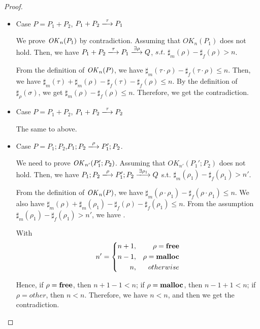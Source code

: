 \begin{proof}
\begin{itemize}
\item Case $P = P_{1} + P_{2}$, \Rtab \(P_1 + P_2 \xlongrightarrow{\tau} P_1\)

  We prove \(\mathit{OK}_n(P_1)\) by contradiction.  Assuming that
  \(OK_{n}(P_1)\) does not hold.  Then, we have \(P_{1} + P_{2}
  \xlongrightarrow{\tau} P_{1} \xlongrightarrow{\exists \rho} Q\),
  \(s.t.\) \(\sharp_{m}(\rho) - \sharp_{f}(\rho) > n\).

  From the definition of \(\mathit{OK}_n(P)\),
  we have \(\sharp_m(\tau \cdot \rho) -\sharp_f(\tau \cdot \rho) \le
  n\). Then, we have \(\sharp_m(\tau) + \sharp_m(\rho) -
  \sharp_f(\tau) -\sharp_f(\rho) \le n\).  By the definition of
  \(\sharp_\rho(\sigma)\),  we get \(\sharp_m(\rho) -\sharp_f(\rho)
  \le n\). Therefore, we get the contradiction.

\item Case $P = P_{1} + P_{2}$, \Rtab \(P_1 + P_2 \xlongrightarrow{\tau} P_2\)

 The same to above.

\item Case $P = P_{1};P_{2}$,\Rtab \(P_1;P_2 \xlongrightarrow{\rho} P_1';P_2\).


  We need to prove \(\mathit{OK}_{n'}(P_1';P_2)\).  Assuming that
  \(OK_{n'}(P_{1}';P_{2})\) does not hold. Then, we have \(P_{1};P_{2}
  \xlongrightarrow{\rho} P_{1}';P_{2} \xlongrightarrow{\exists \rho_1}
  Q\) s.t. \(\sharp_{m}(\rho_1) - \sharp_{f}(\rho_1) > n'\).

  From the definition of \(\mathit{OK}_n(P)\), we have \( \sharp_{m}(\rho
  \cdot \rho_1) - \sharp_{f}(\rho \cdot \rho_1) \le n\).  We also have
  \(\sharp_{m}(\rho) + \sharp_{m}(\rho_1) - \sharp_{f}(\rho)
  -\sharp_{f}(\rho_1) \le n\).  From the assumption
  \(\sharp_{m}(\rho_1) - \sharp_{f}(\rho_1) > n'\), we have .

With
$$
   n'=\left\{
   \begin{aligned}
     n + 1, && \rho = \mathbf{free} \\
     n - 1,  && \rho = \mathbf{malloc}  \\
     n ,      && otherwise
   \end{aligned}
   \right.
$$

   Hence, if \(\rho = \mathbf{free}\), then \(n + 1 - 1 < n\); if \(\rho =
   \mathbf{malloc}\), then \( n - 1 + 1 < n \); if \( \rho = other\), then \(
   n < n \). Therefore, we have \(n < n\), and then we get the
   contradiction.


\end{itemize}
\end{proof}
